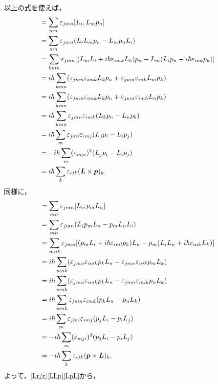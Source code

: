 以上の式を使えば，
\begin{align}
  [L_i,(\boldsymbol{L}\times\boldsymbol{p})_j]
  & = \sum_{mn}\varepsilon_{jmn}[L_i,L_mp_n]\notag\\
  & = \sum_{mn}\varepsilon_{jmn}(L_iL_mp_n - L_mp_nL_i)\notag\\
  & = \sum_{kmn}\varepsilon_{jmn}[(L_mL_i + i\hbar\varepsilon_{imk}L_k)p_n - L_m(L_ip_n - i\hbar\varepsilon_{ink}p_k)]\notag\\
  & = i\hbar\sum_{kmn}(\varepsilon_{jmn}\varepsilon_{imk}L_kp_n + \varepsilon_{jmn}\varepsilon_{ink}L_mp_k)\notag\\
  & = i\hbar\sum_{kmn}(\varepsilon_{jmn}\varepsilon_{imk}L_kp_n + \varepsilon_{jnm}\varepsilon_{imk}L_np_k)\notag\\
  & = i\hbar\sum_{kmn}\varepsilon_{jmn}\varepsilon_{imk}(L_kp_n - L_np_k)\notag\\
  & = i\hbar\sum_m\varepsilon_{jmi}\varepsilon_{imj}(L_jp_i - L_ip_j)\notag\\
  & = - i\hbar\sum_m(\varepsilon_{mji})^2(L_jp_i - L_ip_j)\notag\\
  & = i\hbar\sum_k\varepsilon_{ijk}(\boldsymbol{L}\times\boldsymbol{p})_k.\label{LLp}
\end{align}
同様に，
\begin{align}
  [L_i,(\boldsymbol{p}\times\boldsymbol{L})_j]
  & = \sum_{mn}\varepsilon_{jmn}[L_i,p_mL_n]\notag\\
  & = \sum_{mn}\varepsilon_{jmn}(L_ip_mL_n - p_mL_nL_i)\notag\\
  & = \sum_{mnk}\varepsilon_{jmn}[(p_mL_i + i\hbar\varepsilon_{iml}p_k)L_n - p_m(L_iL_n + i\hbar\varepsilon_{nik}L_k)]\notag\\
  & = i\hbar\sum_{mnk}(\varepsilon_{jmn}\varepsilon_{imk}p_kL_n - \varepsilon_{jmn}\varepsilon_{nik}p_mL_k)\notag\\
  & = i\hbar\sum_{mnk}(\varepsilon_{jmn}\varepsilon_{imk}p_kL_n - \varepsilon_{jnm}\varepsilon_{mik}p_nL_k)\notag\\
  & = i\hbar\sum_{mnk}\varepsilon_{jmn}\varepsilon_{imk}(p_kL_n - p_nL_k)\notag\\
  & = i\hbar\sum_m\varepsilon_{jmi}\varepsilon_{imj}(p_jL_i - p_iL_j)\notag\\
  & = - i\hbar\sum_m(\varepsilon_{mji})^2(p_jL_i - p_iL_j)\notag\\
  & = - i\hbar\sum_k\varepsilon_{ijk}(\boldsymbol{p}\times\boldsymbol{L})_k.\label{LpL}
\end{align}
よって，\eqref{Lr/r}\eqref{LLp}\eqref{LpL}から，

